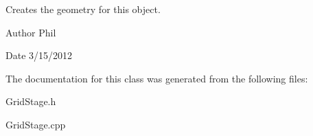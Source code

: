 Creates the geometry for this object. 

\begin{DoxyAuthor}{Author}
Phil 
\end{DoxyAuthor}
\begin{DoxyDate}{Date}
3/15/2012 
\end{DoxyDate}


The documentation for this class was generated from the following files\-:\begin{DoxyCompactItemize}
\item 
Grid\-Stage.\-h\item 
Grid\-Stage.\-cpp\end{DoxyCompactItemize}
